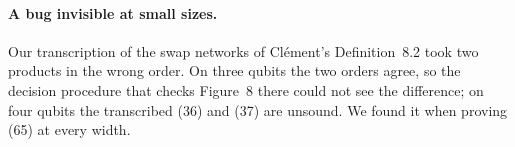 \paragraph{A bug invisible at small sizes.} Our transcription of the
swap networks of Cl\'ement's Definition~8.2 took two products in the
wrong order. On three qubits the two orders agree, so the decision
procedure that checks Figure~8 there could not see the difference; on
four qubits the transcribed (36) and (37) are unsound. We found it when
proving (65) at every width.
